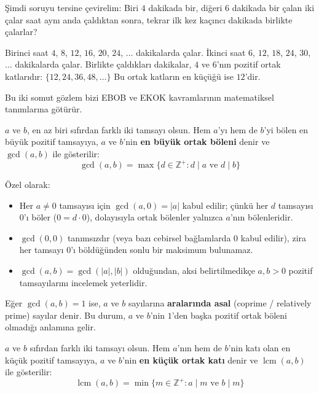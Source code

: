 Şimdi soruyu tersine çevirelim: Biri $4$ dakikada bir, diğeri $6$ dakikada bir çalan iki çalar saat aynı anda çaldıktan sonra, tekrar ilk kez kaçıncı dakikada birlikte çalarlar?

Birinci saat $4$, $8$, $12$, $16$, $20$, $24$, $\dots$ dakikalarda çalar.
İkinci saat $6$, $12$, $18$, $24$, $30$, $\dots$ dakikalarda çalar.
Birlikte çaldıkları dakikalar, $4$ ve $6$'nın pozitif ortak katlarıdır:
$\{12, 24, 36, 48, \dots\}$
Bu ortak katların en küçüğü ise $12$'dir.

Bu iki somut gözlem bizi EBOB ve EKOK kavramlarının matematiksel tanımlarına götürür.

\begin{definition}
$a$ ve $b$, en az biri sıfırdan farklı iki tamsayı olsun. Hem $a$'yı hem de $b$'yi bölen en büyük pozitif tamsayıya, $a$ ve $b$'nin \textbf{en büyük ortak böleni} denir ve $\gcd(a, b)$ ile gösterilir:
\[ \gcd(a, b) = \max \{ d \in \mathbb{Z}^+ : d \mid a \text{ ve } d \mid b \} \]
\end{definition}

Özel olarak:
\begin{itemize}
    \item Her $a \neq 0$ tamsayısı için $\gcd(a, 0) = |a|$ kabul edilir; çünkü her $d$ tamsayısı $0$'ı böler ($0 = d \cdot 0$), dolayısıyla ortak bölenler yalnızca $a$'nın bölenleridir.
    \item $\gcd(0, 0)$ tanımsızdır (veya bazı cebirsel bağlamlarda $0$ kabul edilir), zira her tamsayı $0$'ı böldüğünden sonlu bir maksimum bulunamaz.
    \item $\gcd(a, b) = \gcd(|a|, |b|)$ olduğundan, aksi belirtilmedikçe $a, b > 0$ pozitif tamsayılarını incelemek yeterlidir.
\end{itemize}

\begin{definition}
Eğer $\gcd(a, b) = 1$ ise, $a$ ve $b$ sayılarına \textbf{aralarında asal} (coprime / relatively prime) sayılar denir. Bu durum, $a$ ve $b$'nin $1$'den başka pozitif ortak böleni olmadığı anlamına gelir.
\end{definition}

\begin{definition}
$a$ ve $b$ sıfırdan farklı iki tamsayı olsun. Hem $a$'nın hem de $b$'nin katı olan en küçük pozitif tamsayıya, $a$ ve $b$'nin \textbf{en küçük ortak katı} denir ve $\operatorname{lcm}(a, b)$ ile gösterilir:
\[ \operatorname{lcm}(a, b) = \min \{ m \in \mathbb{Z}^+ : a \mid m \text{ ve } b \mid m \} \]
\end{definition}

